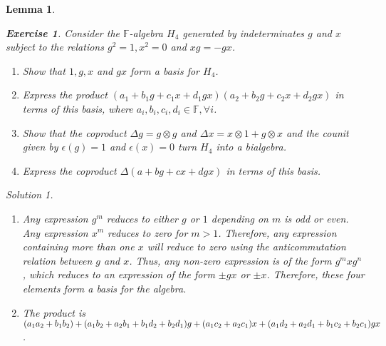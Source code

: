 \documentclass{article}
\newtheorem{Lemma}{Lemma}
\theoremstyle{definition}
\newtheorem{Exercise}{Exercise}
\theoremstyle{remark}
\newtheorem*{Solution*}{Solution}
\theoremstyle{underline}
\theoremstyle{underline}
\begin{document}
\begin{Lemma}
	\begin{Exercise}
		Consider the $\mathbb F$-algebra $H_4$ generated by indeterminates $g$ and $x$ subject to the relations $g^2 = 1, x^2 = 0$ and $xg = -gx$.
		\begin{enumerate}[label=(\alph*)]
			\item Show that $1, g, x$ and $gx$ form a basis for $H_4$.
			\item Express the product $(a_1 + b_1 g + c_1 x + d_1 gx)(a_2 + b_2 g + c_2 x + d_2 gx)$ in terms of this basis, where $a_i, b_i, c_i, d_i \in \mathbb F, \forall i$.
			\item Show that the coproduct $\Delta g = g \otimes g$ and $\Delta x = x \otimes 1 + g \otimes x$ and the counit given by $\epsilon(g) = 1$ and $\epsilon(x) = 0$ turn $H_4$ into a bialgebra.
			\item Express the coproduct $\Delta(a + bg + cx + dgx)$ in terms of this basis.
		\end{enumerate}
	\end{Exercise}
	\begin{Solution*}
		\begin{enumerate}[label=(\alph*)]
			\item Any expression $g^m$ reduces to either $g$ or $1$ depending on $m$ is odd or even. Any expression $x^m$ reduces to zero for $m > 1$. Therefore, any expression containing more than one $x$ will reduce to zero using the anticommutation relation between $g$ and $x$. Thus, any non-zero expression is of the form $g^m x g^n$, which reduces to an expression of the form $\pm gx$ or $\pm x$. Therefore, these four elements form a basis for the algebra.

			\item The product is $\pqty{a_1 a_2 + b_1 b_2} + \pqty{a_1 b_2 + a_2 b_1 + b_1 d_2 + b_2 d_1}g + \pqty{a_1 c_2 + a_2 c_1}x + \pqty{a_1 d_2 + a_2 d_1 + b_1 c_2 + b_2 c_1}gx $.


\end{enumerate}
\end{Solution*}
\end{Lemma}
\end{document}
